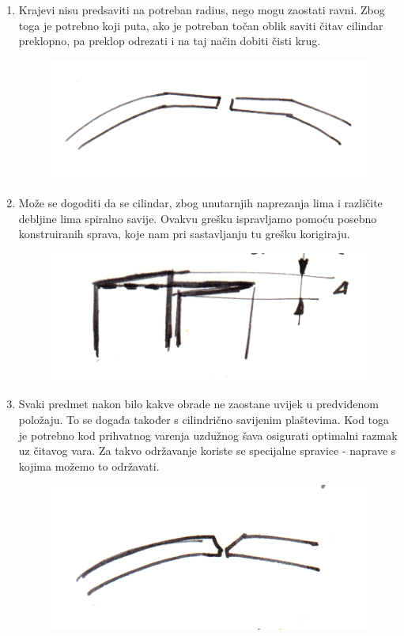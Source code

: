\documentclass[a4paper,12pt]{article}
\numberwithin{figure}{section}
\begin{document}
\begin{enumerate}
\item Krajevi nisu predsaviti na potreban radius, nego mogu zaostati ravni. Zbog toga je potrebno koji puta, ako je potreban točan oblik saviti čitav cilindar preklopno, pa preklop odrezati i na taj način dobiti čisti krug.
\begin{figure}[!h]
\centering
\includegraphics[scale=0.1]{image_52-1.png}
\end{figure}
\FloatBarrier
\item Može se dogoditi da se cilindar, zbog unutarnjih naprezanja lima i različite debljine lima spiralno savije. Ovakvu grešku ispravljamo pomoću posebno konstruiranih sprava, koje nam pri sastavljanju tu grešku korigiraju.
\begin{figure}[!h]
\centering
\includegraphics[scale=0.1]{image_52-2.png}
\end{figure}
\FloatBarrier
\item Svaki predmet nakon bilo kakve obrade ne zaostane uvijek u predviđenom položaju. To se događa također s cilindrično savijenim plaštevima. Kod toga je potrebno kod prihvatnog varenja uzdužnog šava osigurati optimalni razmak uz čitavog vara. Za takvo održavanje koriste se specijalne spravice - naprave s kojima možemo to  održavati.
\begin{figure}[!h]
\centering
\includegraphics[scale=0.1]{image_52-3.png}
\end{figure}
\FloatBarrier
\end{enumerate}
\clearpage
\end{document}
